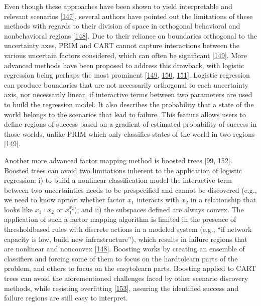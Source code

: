 \documentclass[letterpaper,10pt,english]{sphinxmanual}
\begin{document}
\sphinxAtStartPar
Even though these approaches have been shown to yield interpretable and relevant scenarios {[}\hyperlink{cite.index:id83}{147}{]}, several authors have pointed out the limitations of these methods with regards to their division of space in orthogonal behavioral and non\sphinxhyphen{}behavioral regions {[}\hyperlink{cite.index:id84}{148}{]}. Due to their reliance on boundaries orthogonal to the uncertainty axes, PRIM and CART cannot capture interactions between the various uncertain factors considered, which can often be significant {[}\hyperlink{cite.index:id85}{149}{]}. More advanced methods have been proposed to address this drawback, with logistic regression being perhaps the most prominent {[}\hyperlink{cite.index:id85}{149}, \hyperlink{cite.index:id86}{150}, \hyperlink{cite.index:id87}{151}{]}. Logistic regression can produce boundaries that are not necessarily orthogonal to each uncertainty axis, nor necessarily linear, if interactive terms between two parameters are used to build the regression model. It also describes the probability that a state of the world belongs to the scenarios that lead to failure. This feature allows users to define regions of success based on a gradient of estimated probability of success in those worlds, unlike PRIM which only classifies states of the world in two regions {[}\hyperlink{cite.index:id85}{149}{]}.

\sphinxAtStartPar
Another more advanced factor mapping method is boosted trees {[}\hyperlink{cite.index:id89}{99}, \hyperlink{cite.index:id88}{152}{]}. Boosted trees can avoid two limitations inherent to the application of logistic regression: i) to build a nonlinear classification model the interactive term between two uncertainties needs to be pre\sphinxhyphen{}specified and cannot be discovered (e.g., we need to know a\sphinxhyphen{}priori whether factor \(x_1\) interacts with \(x_2\) in a relationship that looks like \(x_1\)·\(x_2\) or \(x_1^{x_2}\)); and ii) the subspaces defined are always convex. The application of such a factor mapping algorithm is limited in the presence of threshold\sphinxhyphen{}based rules with discrete actions in a modeled system (e.g., “if network capacity is low, build new infrastructure”), which results in failure regions that are nonlinear and non\sphinxhyphen{}convex {[}\hyperlink{cite.index:id84}{148}{]}. Boosting works by creating an ensemble of classifiers and forcing some of them to focus on the hard\sphinxhyphen{}to\sphinxhyphen{}learn parts of the problem, and others to focus on the easy\sphinxhyphen{}to\sphinxhyphen{}learn parts. Boosting applied to CART trees can avoid the aforementioned challenges faced by other scenario discovery methods, while resisting overfitting {[}\hyperlink{cite.index:id90}{153}{]}, assuring the identified success and failure regions are still easy to interpret.
\end{document}
